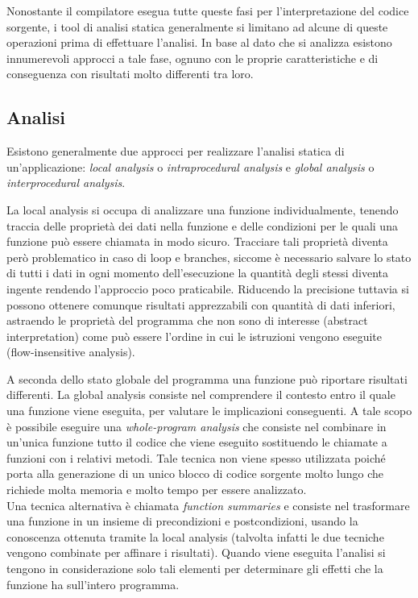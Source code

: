 Nonostante il compilatore esegua tutte queste fasi per l'interpretazione del codice sorgente, i tool di analisi statica generalmente si limitano ad alcune di queste operazioni prima di effettuare l'analisi. In base al dato che si analizza esistono innumerevoli approcci a tale fase, ognuno con le proprie caratteristiche e di conseguenza con risultati molto differenti tra loro.\\

\subsection{Analisi}
Esistono generalmente due approcci per realizzare l'analisi statica di un'applicazione: \emph{local analysis} o \emph{intraprocedural analysis} e \emph{global analysis} o \emph{interprocedural analysis}.

La local analysis si occupa di analizzare una funzione individualmente, tenendo traccia delle proprietà dei dati nella funzione e delle condizioni per le quali una funzione può essere chiamata in modo sicuro. Tracciare tali proprietà diventa però problematico in caso di loop e branches, siccome è necessario salvare lo stato di tutti i dati in ogni momento dell'esecuzione la quantità degli stessi diventa ingente rendendo l'approccio poco praticabile. Riducendo la precisione tuttavia si possono ottenere comunque risultati apprezzabili con quantità di dati inferiori, astraendo le proprietà del programma che non sono di interesse (abstract interpretation) come può essere l'ordine in cui le istruzioni vengono eseguite (flow-insensitive analysis).

A seconda dello stato globale del programma una funzione può riportare risultati differenti. La global analysis consiste nel comprendere il contesto entro il quale una funzione viene eseguita, per valutare le implicazioni conseguenti. A tale scopo è possibile eseguire una \emph{whole-program analysis} che consiste nel combinare in un'unica funzione tutto il codice che viene eseguito sostituendo le chiamate a funzioni con i relativi metodi. Tale tecnica non viene spesso utilizzata poiché porta alla generazione di un unico blocco di codice sorgente molto lungo che richiede molta memoria e molto tempo per essere analizzato.\\
Una tecnica alternativa è chiamata \emph{function summaries} e consiste nel trasformare una funzione in un insieme di precondizioni e postcondizioni, usando la conoscenza ottenuta tramite la local analysis (talvolta infatti le due tecniche vengono combinate per affinare i risultati). Quando viene eseguita l'analisi si tengono in considerazione solo tali elementi per determinare gli effetti che la funzione ha sull'intero programma. 

